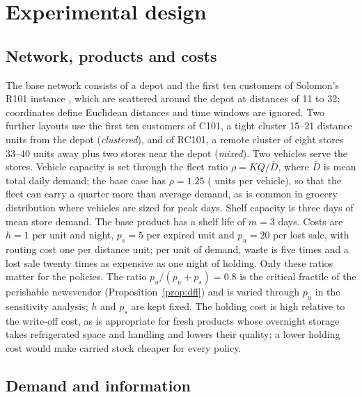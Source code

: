 \section{Experimental design}\label{sec:design}

\subsection{Network, products and costs}

The base network consists of a depot and the first ten customers of Solomon's R101 instance \citep{solomon1987algorithms}, which are scattered around the depot at distances of 11 to 32; coordinates define Euclidean distances and time windows are ignored. Two further layouts use the first ten customers of C101, a tight cluster 15--21 distance units from the depot (\emph{clustered}), and of RC101, a remote cluster of eight stores 33--40 units away plus two stores near the depot (\emph{mixed}). Two vehicles serve the stores. Vehicle capacity is set through the fleet ratio $\rho=KQ/\bar D$, where $\bar D$ is mean total daily demand; the base case has $\rho=1.25$ (\VehicleCap{} units per vehicle), so that the fleet can carry a quarter more than average demand, as is common in grocery distribution where vehicles are sized for peak days. Shelf capacity is three days of mean store demand. The base product has a shelf life of $m=3$ days. Costs are $h=1$ per unit and night, $p_s=5$ per expired unit and $p_u=20$ per lost sale, with routing cost one per distance unit; per unit of demand, waste is five times and a lost sale twenty times as expensive as one night of holding. Only these ratios matter for the policies. The ratio $p_u/(p_u+p_s)=0.8$ is the critical fractile of the perishable newsvendor (Proposition~\ref{prop:dfl}) and is varied through $p_u$ in the sensitivity analysis; $h$ and $p_s$ are kept fixed. The holding cost is high relative to the write-off cost, as is appropriate for fresh products whose overnight storage takes refrigerated space and handling and lowers their quality; a lower holding cost would make carried stock cheaper for every policy.

\subsection{Demand and information}


